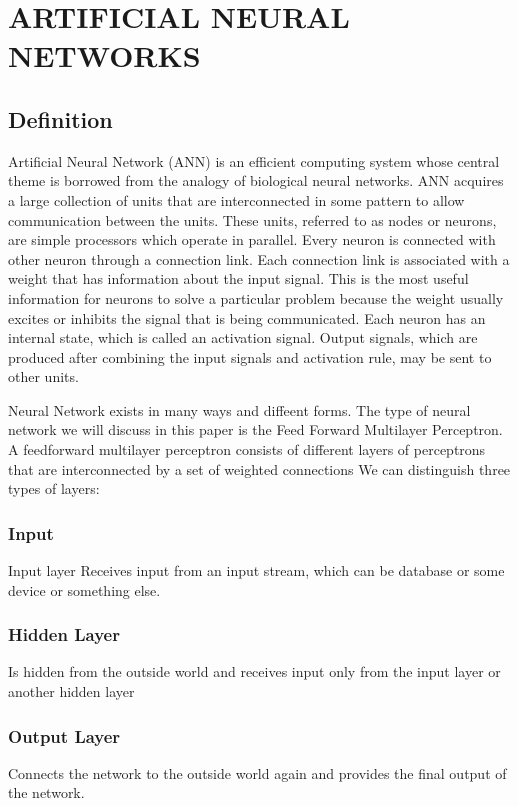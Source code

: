 \documentclass{report}
\begin{document}
\chapter{ARTIFICIAL NEURAL NETWORKS}
\section{Definition}
Artificial Neural Network (ANN)\cite{ANN} is an efficient computing system whose central theme is borrowed from the analogy of biological neural networks. ANN acquires a large collection of units that are interconnected in some pattern to allow communication between the units. These units, referred to as nodes or neurons, are simple processors which operate in parallel.
Every neuron is connected with other neuron through a connection link. Each connection link is associated with a weight that has information about the input signal. This is the most useful information for neurons to solve a particular problem because the weight usually excites or inhibits the signal that is being communicated. Each neuron has an internal state, which is called an activation signal. Output signals, which are produced after combining the input signals and activation rule, may be sent to other units.



Neural Network exists in many ways and diffeent forms. The type of neural network we will discuss in this paper is the Feed Forward Multilayer Perceptron. A feedforward multilayer perceptron consists of different layers of perceptrons that are interconnected by a set of weighted connections We can distinguish three types of layers:

\subsection{Input}
Input layer Receives input from an input stream, which can be database or some device or something else.

\subsection{Hidden Layer}
Is hidden from the outside world and receives input only from the input layer or another hidden layer

\subsection{Output Layer}
Connects the network to the outside world again and provides the final output of the network.
\end{document}
